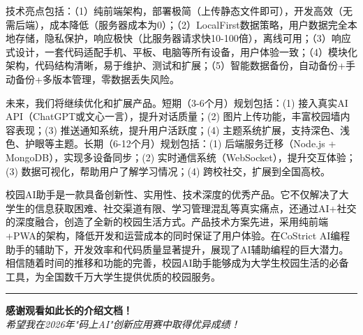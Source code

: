 \documentclass[12pt,a4paper]{article}
\begin{document}
技术亮点包括：（1）纯前端架构，部署极简（上传静态文件即可），开发高效（无需后端），成本降低（服务器成本为0）；（2）LocalFirst数据策略，用户数据完全本地存储，隐私保护，响应极快（比服务器请求快10-100倍），离线可用；（3）响应式设计，一套代码适配手机、平板、电脑等所有设备，用户体验一致；（4）模块化架构，代码结构清晰，易于维护、测试和扩展；（5）智能数据备份，自动备份+手动备份+多版本管理，零数据丢失风险。

未来，我们将继续优化和扩展产品。短期（3-6个月）规划包括：(1) 接入真实AI API（ChatGPT或文心一言），提升对话质量；(2) 图片上传功能，丰富校园墙内容表现；(3) 推送通知系统，提升用户活跃度；(4) 主题系统扩展，支持深色、浅色、护眼等主题。长期（6-12个月）规划包括：(1) 后端服务迁移（Node.js + MongoDB），实现多设备同步；(2) 实时通信系统（WebSocket），提升交互体验；(3) 数据可视化，帮助用户了解学习情况；(4) 跨校社交，扩展到全国高校。

校园AI助手是一款具备创新性、实用性、技术深度的优秀产品。它不仅解决了大学生的信息获取困难、社交渠道有限、学习管理混乱等真实痛点，还通过AI+社交的深度融合，创造了全新的校园生活方式。产品技术方案先进，采用纯前端+PWA的架构，降低开发和运营成本的同时保证了用户体验。在CoStrict AI编程助手的辅助下，开发效率和代码质量显著提升，展现了AI辅助编程的巨大潜力。相信随着时间的推移和功能的完善，校园AI助手能够成为大学生校园生活的必备工具，为全国数千万大学生提供优质的校园服务。

\vspace{2cm}
\hrule
\vspace{0.5cm}

\begin{center}
\textbf{\Large 感谢观看如此长的介绍文档！}\\
\vspace{0.5cm}
\textit{希望我在2026年"码上AI"创新应用赛中取得优异成绩！}
\end{center}
\end{document}

